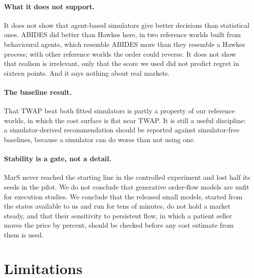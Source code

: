 \paragraph{What it does not support.} It does not show that agent-based simulators give better decisions than statistical ones. ABIDES did better than Hawkes here, in two reference worlds built from behavioural agents, which resemble ABIDES more than they resemble a Hawkes process; with other reference worlds the order could reverse. It does not show that realism is irrelevant, only that the score we used did not predict regret in sixteen points. And it says nothing about real markets.

\paragraph{The baseline result.} That TWAP beat both fitted simulators is partly a property of our reference worlds, in which the cost surface is flat near TWAP. It is still a useful discipline: a simulator-derived recommendation should be reported against simulator-free baselines, because a simulator can do worse than not using one.

\paragraph{Stability is a gate, not a detail.} MarS never reached the starting line in the controlled experiment and lost half its seeds in the pilot. We do not conclude that generative order-flow models are unfit for execution studies. We conclude that the released small models, started from the states available to us and run for tens of minutes, do not hold a market steady, and that their sensitivity to persistent flow, in which a patient seller moves the price by percent, should be checked before any cost estimate from them is used.

\section{Limitations}
\label{sec:limits}

